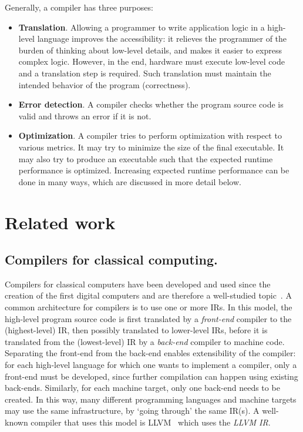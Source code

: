 Generally, a compiler has three purposes:

\begin{itemize}

\item \textbf{Translation}.
Allowing a programmer to write application logic in a high-level language improves the accessibility:
it relieves the programmer of the burden of thinking about low-level details, and makes it easier to express complex logic.
However, in the end, hardware must execute low-level code and a translation step is required.
Such translation must maintain the intended behavior of the program (correctness).

\item \textbf{Error detection}.
A compiler checks whether the program source code is valid and throws an error if it is not.

\item \textbf{Optimization}.
A compiler tries to perform optimization with respect to various metrics.
It may try to minimize the size of the final executable.
It may also try to produce an executable such that the expected runtime performance is optimized.
Increasing expected runtime performance can be done in many ways, which are discussed in more detail below.

\end{itemize}



\section{Related work}
\label{compiler:sec:related-work}

\subsection{Compilers for classical computing.}
Compilers for classical computers have been developed and used since the creation of the first digital computers and are therefore a well-studied topic~\cite{aho_compilers_2006}.
A common architecture for compilers is to use one or more \ac{IR}s.
In this model, the high-level program source code is first translated by a \emph{front-end} compiler to the (highest-level) \ac{IR}, then possibly translated to lower-level \ac{IR}s, before it is translated from the (lowest-level) \ac{IR} by a \emph{back-end} compiler to machine code.
Separating the front-end from the back-end enables extensibility of the compiler: for each high-level language for which one wants to implement a compiler, only a front-end must be developed, since further compilation can happen using existing back-ends.
Similarly, for each machine target, only one back-end needs to be created.
In this way, many different programming languages and machine targets may use the same infrastructure, by `going through' the same \ac{IR}(s).
A well-known compiler that uses this model is LLVM~\cite{lattner_llvm_2004} which uses the \emph{LLVM IR}.

